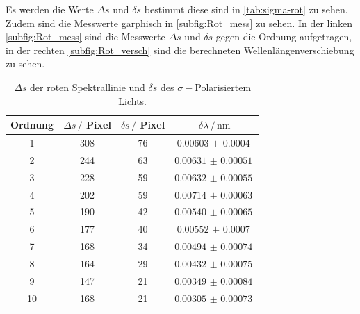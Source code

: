 Es werden die Werte $\Delta s$ und $\delta s$ bestimmt diese sind in \autoref{tab:sigma-rot} zu sehen.
Zudem sind die Messwerte garphisch in \autoref{subfig:Rot_mess} zu sehen.
In der linken \autoref{subfig:Rot_mess} sind die Messwerte $\Delta s$ und $\delta s$ gegen die Ordnung aufgetragen,
in der rechten \autoref{subfig:Rot_versch} sind die berechneten Wellenlängenverschiebung zu sehen.
\begin{table}
    \centering
    \caption{$\Delta s$ der roten Spektrallinie und $\delta s$ des $\sigma -$Polarisiertem Lichts.}
    \begin{tabular}{cccc}
        \toprule
        Ordnung & $\Delta s \, /$ Pixel & $\delta s \, /$ Pixel & $\delta \lambda \, / \, \si{\nano\meter}$ \\
        \midrule
        1   &   308  &    76 & $\SI{0.00603(40)}{}$   \\
        2   &   244  &    63 & $\SI{0.00631(51)}{}$   \\
        3   &   228  &    59 & $\SI{0.00632(55)}{}$   \\
        4   &   202  &    59 & $\SI{0.00714(63)}{}$   \\
        5   &   190  &    42 & $\SI{0.00540(65)}{}$   \\
        6   &   177  &    40 & $\SI{0.00552(70)}{}$   \\
        7   &   168  &    34 & $\SI{0.00494(74)}{}$   \\
        8   &   164  &    29 & $\SI{0.00432(75)}{}$   \\
        9   &   147  &    21 & $\SI{0.00349(84)}{}$   \\
        10  &   168  &    21 & $\SI{0.00305(73)}{}$   \\
        \bottomrule
    \end{tabular}
    \label{tab:sigma-rot}
\end{table}

